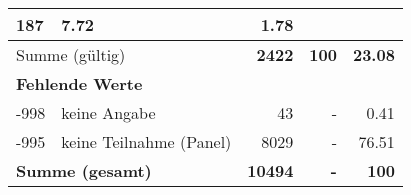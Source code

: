 \begin{longtable}{lXrrr}
       \num{187} &
       \num[round-mode=places,round-precision=2]{7.72} &
         \num[round-mode=places,round-precision=2]{1.78} \\
     \midrule
     \multicolumn{2}{l}{Summe (gültig)} &
       \textbf{\num{2422}} &
     \textbf{\num{100}} &
       \textbf{\num[round-mode=places,round-precision=2]{23.08}} \\
     \multicolumn{5}{l}{\textbf{Fehlende Werte}}\\
       -998 &
       keine Angabe &
         \num{43} &
        - &
         \num[round-mode=places,round-precision=2]{0.41} \\
       -995 &
       keine Teilnahme (Panel) &
         \num{8029} &
        - &
         \num[round-mode=places,round-precision=2]{76.51} \\
     \midrule
     \multicolumn{2}{l}{\textbf{Summe (gesamt)}} &
          \textbf{\num{10494}} &
        \textbf{-} &
        \textbf{\num{100}} \\
     \bottomrule
     \end{longtable}
     
